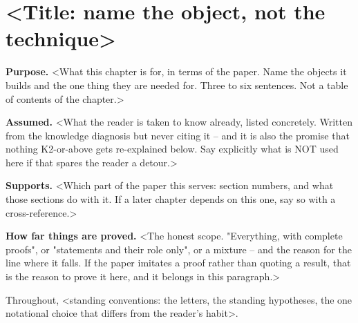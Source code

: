%
%
\chapter{<Title: name the object, not the technique>}
\label{ch:SLUG}

\begin{chapterheader}
\textbf{Purpose.}
<What this chapter is for, in terms of the paper.  Name the objects it builds
and the one thing they are needed for.  Three to six sentences.  Not a table
of contents of the chapter.>

\medskip
\textbf{Assumed.}
<What the reader is taken to know already, listed concretely.  Written from
the knowledge diagnosis but never citing it -- and it is also the promise that
nothing K2-or-above gets re-explained below.  Say explicitly what is NOT used
here if that spares the reader a detour.>

\medskip
\textbf{Supports.}
<Which part of the paper this serves: section numbers, and what those sections
do with it.  If a later chapter depends on this one, say so with a
cross-reference.>

\medskip
\textbf{How far things are proved.}
<The honest scope.  "Everything, with complete proofs", or "statements and
their role only", or a mixture -- and the reason for the line where it falls.
If the paper imitates a proof rather than quoting a result, that is the reason
to prove it here, and it belongs in this paragraph.>
\end{chapterheader}

Throughout, <standing conventions: the letters, the standing hypotheses, the
one notational choice that differs from the reader's habit>.

